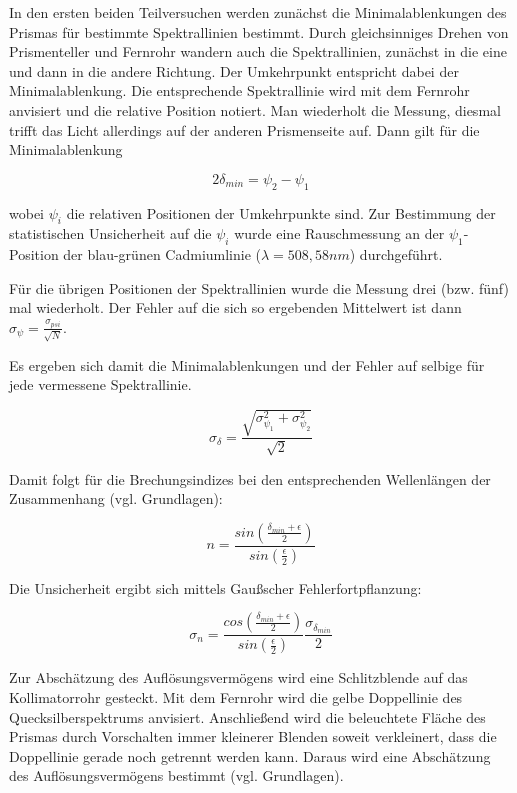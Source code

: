 \documentclass[12pt,a4paper]{article}
\begin{document}
In den ersten beiden Teilversuchen werden zunächst die Minimalablenkungen des Prismas für bestimmte Spektrallinien bestimmt.
Durch gleichsinniges Drehen von Prismenteller und Fernrohr wandern auch die Spektrallinien, zunächst in die eine und dann in die andere Richtung. Der Umkehrpunkt entspricht dabei der Minimalablenkung. Die entsprechende Spektrallinie wird mit dem Fernrohr anvisiert und die relative Position notiert. Man wiederholt die Messung, diesmal trifft das Licht allerdings auf der anderen Prismenseite auf. Dann gilt für die Minimalablenkung

\begin{equation}
2 \delta_{min} = \psi_2-\psi_1
\end{equation}

wobei $\psi_i$ die relativen Positionen der Umkehrpunkte sind.
Zur Bestimmung der statistischen Unsicherheit auf die $\psi_i$ wurde eine Rauschmessung an der $\psi_1$-Position der blau-grünen Cadmiumlinie ($\lambda=508,58nm$) durchgeführt.

Für die übrigen Positionen der Spektrallinien wurde die Messung drei (bzw. fünf) mal wiederholt. Der Fehler auf die sich so ergebenden Mittelwert ist dann $\sigma_{\psi}=\frac{\sigma_{psi}}{\sqrt{N}}$.

Es ergeben sich damit die Minimalablenkungen und der Fehler auf selbige für jede vermessene Spektrallinie.

\begin{equation}
\sigma_{\delta} = \frac{\sqrt{\sigma_{\psi_1}^2+\sigma_{\psi_2}^2}}{\sqrt{2}}
\end{equation}

Damit folgt für die Brechungsindizes bei den entsprechenden Wellenlängen der Zusammenhang (vgl. Grundlagen):

\begin{equation}
n = \frac{sin(\frac{\delta_{min}+\epsilon}{2})}{sin(\frac{\epsilon}{2})}
\end{equation}

Die Unsicherheit ergibt sich mittels Gaußscher Fehlerfortpflanzung:

\begin{equation}
\sigma_n = \frac{cos(\frac{\delta_{min}+\epsilon}{2})}{sin(\frac{\epsilon}{2})} \frac{\sigma_{\delta_{min}}}{2}
\end{equation}


Zur Abschätzung des Auflösungsvermögens wird eine Schlitzblende auf das Kollimatorrohr gesteckt. Mit dem Fernrohr wird die gelbe Doppellinie des Quecksilberspektrums anvisiert.  Anschließend wird die beleuchtete Fläche des Prismas durch Vorschalten immer kleinerer Blenden soweit verkleinert, dass die Doppellinie gerade noch getrennt werden kann. Daraus wird eine Abschätzung des Auflösungsvermögens bestimmt (vgl. Grundlagen). 
\end{document}

